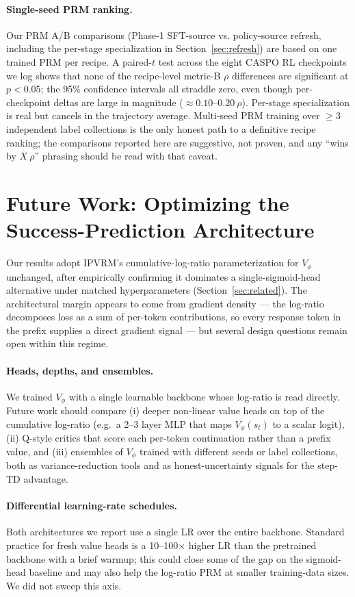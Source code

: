 \documentclass[11pt]{article}
\newcommand{\ipvrm}{IPVRM}
\begin{document}
\paragraph{Single-seed PRM ranking.}
Our PRM A/B comparisons (Phase-1 SFT-source vs. policy-source refresh,
including the per-stage specialization in Section~\ref{sec:refresh})
are based on one trained PRM per recipe. A paired-$t$ test across the
eight CASPO RL checkpoints we log shows that none of the recipe-level
metric-B $\rho$ differences are significant at $p<0.05$; the $95\%$
confidence intervals all straddle zero, even though per-checkpoint
deltas are large in magnitude (${\approx}0.10\text{--}0.20~\rho$).
Per-stage specialization is real but cancels in the trajectory
average. Multi-seed PRM training over $\geq 3$ independent label
collections is the only honest path to a definitive recipe ranking;
the comparisons reported here are suggestive, not proven, and any
``wins by $X~\rho$'' phrasing should be read with that caveat.

\section{Future Work: Optimizing the Success-Prediction Architecture}
\label{sec:future-work}
Our results adopt \ipvrm{}'s cumulative-log-ratio parameterization for
$V_\phi$ unchanged, after empirically confirming it dominates a
single-sigmoid-head alternative under matched hyperparameters
(Section~\ref{sec:related}). The architectural margin appears to come
from gradient density --- the log-ratio decomposes loss as a sum of
per-token contributions, so every response token in the prefix supplies
a direct gradient signal --- but several design questions remain open
within this regime.

\paragraph{Heads, depths, and ensembles.}
We trained $V_\phi$ with a single learnable backbone whose log-ratio is
read directly. Future work should compare (i) deeper non-linear value
heads on top of the cumulative log-ratio (e.g.\ a 2--3 layer MLP that
maps $V_\phi(s_t)$ to a scalar logit), (ii) Q-style critics that score
each per-token continuation rather than a prefix value, and (iii)
ensembles of $V_\phi$ trained with different seeds or label collections,
both as variance-reduction tools and as honest-uncertainty signals for
the step-TD advantage.

\paragraph{Differential learning-rate schedules.}
Both architectures we report use a single LR over the entire backbone.
Standard practice for fresh value heads is a 10--100$\times$ higher LR
than the pretrained backbone with a brief warmup; this could close some
of the gap on the sigmoid-head baseline and may also help the log-ratio
PRM at smaller training-data sizes. We did not sweep this axis.
\end{document}
